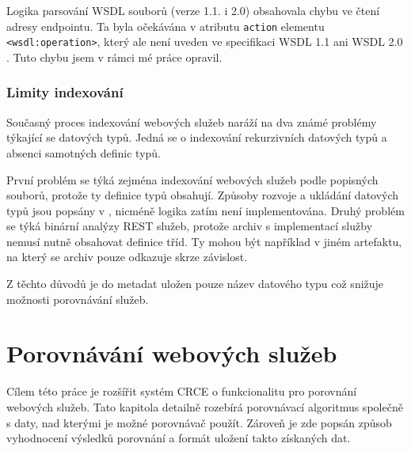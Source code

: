 \documentclass[czech,DP]{thesiskiv}
\begin{document}
Logika parsování WSDL souborů (verze 1.1. i 2.0) obsahovala chybu ve čtení adresy endpointu. Ta byla očekávána v atributu \verb|action| elementu \verb|<wsdl:operation>|, který ale není uveden ve specifikaci WSDL 1.1 \cite{wsdl1} ani WSDL 2.0 \cite{wsdl2}. Tuto chybu jsem v rámci mé práce opravil.

\subsection{Limity indexování}
\label{sec:index-limits}

Současný proces indexování webových služeb naráží na dva známé problémy týkající se datových typů. Jedná se o indexování rekurzivních datových typů a absenci samotných definic typů.

První problém se týká zejména indexování webových služeb podle popisných souborů, protože ty definice typů obsahují. Způsoby rozvoje a ukládání datových typů jsou popsány v \cite{abadi1995subytping}, nicméně logika zatím není implementována. Druhý problém se týká binární analýzy REST služeb, protože archiv s implementací služby nemusí nutně obsahovat definice tříd. Ty mohou být například v jiném artefaktu, na který se archiv pouze odkazuje skrze závislost.

Z těchto důvodů je do metadat uložen pouze název datového typu což snižuje možnosti porovnávání služeb.


\chapter{Porovnávání webových služeb}
\label{sec:alg}

Cílem této práce je rozšířit systém CRCE o funkcionalitu pro porovnání webových služeb. Tato kapitola detailně rozebírá porovnávací algoritmus společně s daty, nad kterými je možné porovnávač použít. Zároveň je zde popsán způsob vyhodnocení výsledků porovnání a formát uložení takto získaných dat.
\end{document}

